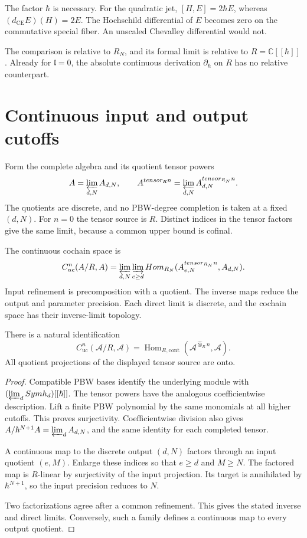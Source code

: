 The factor $\hbar$ is necessary. For the quadratic jet,
$[H,E]=2\hbar E$, whereas $(d_{\mathrm{CE}}E)(H)=2E$.
The Hochschild differential of $E$ becomes zero on the commutative
special fiber. An unscaled Chevalley differential would not.

The comparison is relative to $R_N$, and its formal limit is
relative to $R=\mathbb C[[\hbar]]$. Already for $\mathfrak l=0$,
the absolute continuous derivation $\partial_\hbar$ on $R$
has no relative counterpart.

\section{Continuous input and output cutoffs}

Form the complete algebra and its quotient tensor powers
\[
 \mathcal A=\varprojlim_{d,N}A_{d,N},\qquad
 \mathcal A^{\widehat\otimes_R n}
      =\varprojlim_{d,N}A_{d,N}^{\otimes_{R_N}n}.
\]
The quotients are discrete, and no PBW-degree completion is taken
at a fixed $(d,N)$. For $n=0$ the tensor source is $R$.
Distinct indices in the tensor factors give the same limit,
because a common upper bound is cofinal.

\begin{definition}\label{mht:def:uniform-cochains}
The continuous cochain space is
\[
 C^n_{\mathrm{uc}}(\mathcal A/R,\mathcal A)
 =\varprojlim_{d,N}\varinjlim_{e\geq d}
  \operatorname{Hom}_{R_N}
   (A_{e,N}^{\otimes_{R_N}n},A_{d,N}).
\]
Input refinement is precomposition with a quotient.
The inverse maps reduce the output and parameter precision.
Each direct limit is discrete, and the cochain space has their
inverse-limit topology.
\end{definition}

\begin{proposition}\label{mht:prop:continuous-cochain-carrier}
There is a natural identification
\[
 C^n_{\mathrm{uc}}(\mathcal A/R,\mathcal A)
 =\operatorname{Hom}_{R,\mathrm{cont}}
    (\mathcal A^{\widehat\otimes_R n},\mathcal A).
\]
All quotient projections of the displayed tensor source are onto.
\end{proposition}

\begin{proof}
Compatible PBW bases identify the underlying module with
$(\varprojlim_d\operatorname{Sym}\mathfrak h_d)[[\hbar]]$.
The tensor powers have the analogous coefficientwise description.
Lift a finite PBW polynomial by the same monomials at all higher
cutoffs. This proves surjectivity. Coefficientwise division also
gives
$\mathcal A/\hbar^{N+1}\mathcal A=\varprojlim_dA_{d,N}$,
and the same identity for each completed tensor.

A continuous map to the discrete output $(d,N)$ factors through
an input quotient $(e,M)$. Enlarge these indices so that
$e\geq d$ and $M\geq N$. The factored map is $R$-linear by
surjectivity of the input projection. Its target is annihilated
by $\hbar^{N+1}$, so the input precision reduces to $N$.

Two factorizations agree after a common refinement.
This gives the stated inverse and direct limits. Conversely,
such a family defines a continuous map to every output quotient.
\end{proof}

